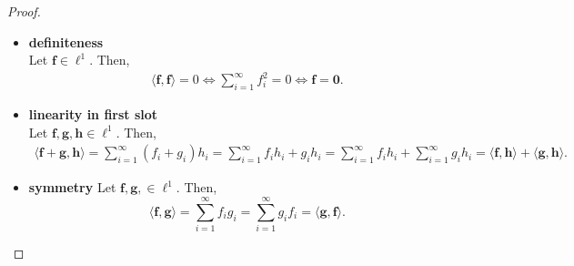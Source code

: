\begin{proof}
\begin{itemize}
        \item \textbf{definiteness} \\ Let $\mathbf{f} \in \ell^{1}$.
            Then,
            \begin{align*}
                \langle \mathbf{f}, \mathbf{f} \rangle = 0
                \iff
                \sum\limits_{i=1}^{\infty} f_i^2 = 0
                \iff
                \mathbf{f} = \mathbf{0}.
            \end{align*}

        \item \textbf{linearity in first slot} \\
            Let $\mathbf{f}, \mathbf{g}, \mathbf{h} \in \ell^{1}$.
            Then,
            \begin{align*}
                \langle \mathbf{f} + \mathbf{g}, \mathbf{h} \rangle
                = \sum\limits_{i=1}^{\infty} (f_i + g_i)h_i
                = \sum\limits_{i=1}^{\infty} f_ih_i + g_ih_i
                = \sum\limits_{i=1}^{\infty} f_ih_i +\sum\limits_{i=1}^{\infty} g_ih_i
                = \langle \mathbf{f}, \mathbf{h} \rangle + \langle \mathbf{g}, \mathbf{h} \rangle.
            \end{align*}

        \item \textbf{symmetry}
            Let $\mathbf{f}, \mathbf{g}, \in \ell^{1}$.
            Then,
            \begin{equation*}
                \langle \mathbf{f}, \mathbf{g} \rangle
                = \sum\limits_{i=1}^{\infty} f_ig_i
                = \sum\limits_{i=1}^{\infty} g_if_i
                = \langle \mathbf{g}, \mathbf{f} \rangle.
            \end{equation*}
    \end{itemize}
\end{proof}


